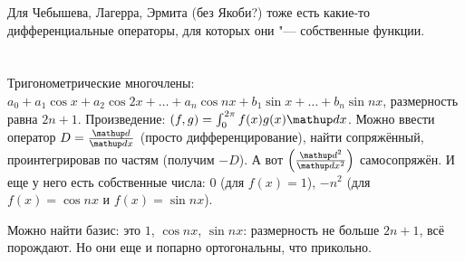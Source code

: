 Для Чебышева, Лагерра, Эрмита (без Якоби?) тоже есть какие-то дифференциальные операторы, для которых они "--- собственные функции.

\section{} %
Тригонометрические многочлены: $a_0+a_1\cos x + a_2\cos 2x + \dots + a_n\cos nx + b_1\sin x + \dots + b_n\sin nx$, размерность равна $2n+1$.
Произведение: $(f, g)=\int_0^{2\pi} f(x)g(x) \d x$.
Можно ввести оператор $D=\frac{\d}{\d x}$ (просто дифференцирование), найти сопряжённый, проинтегрировав по частям (получим $-D$).
А вот $\left(\frac{\d^2}{\d x^2}\right)$ самосопряжён.
И еще у него есть собственные числа: $0$ (для $f(x)=1$), $-n^2$ (для $f(x)=\cos nx$ и $f(x)=\sin nx$).

Можно найти базис: это $1$, $\cos nx$, $\sin nx$: размерность не больше $2n+1$, всё порождают.
Но они еще и попарно ортогональны, что прикольно.
